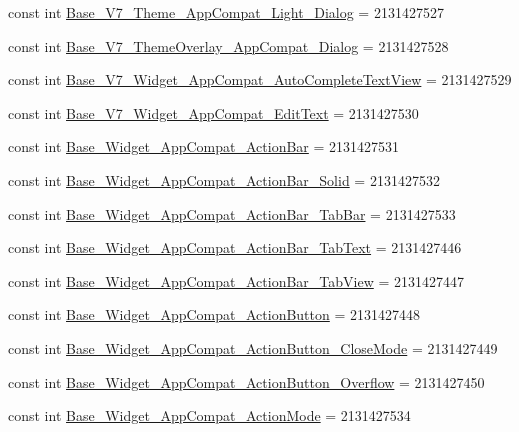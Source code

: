 \begin{CompactItemize}
\item 
const int \hyperlink{class__2doo_1_1_droid_1_1_resource_1_1_style_fa6185cd85da7955cb90ae33723d51fa}{Base\_\-V7\_\-Theme\_\-AppCompat\_\-Light\_\-Dialog} = 2131427527
\item 
const int \hyperlink{class__2doo_1_1_droid_1_1_resource_1_1_style_6022399950c3750d872cf721797a8383}{Base\_\-V7\_\-ThemeOverlay\_\-AppCompat\_\-Dialog} = 2131427528
\item 
const int \hyperlink{class__2doo_1_1_droid_1_1_resource_1_1_style_a0dbbf6b7a5382446156c4c8abe09c50}{Base\_\-V7\_\-Widget\_\-AppCompat\_\-AutoCompleteTextView} = 2131427529
\item 
const int \hyperlink{class__2doo_1_1_droid_1_1_resource_1_1_style_3a19da70cdb33137d14d12c1218bb803}{Base\_\-V7\_\-Widget\_\-AppCompat\_\-EditText} = 2131427530
\item 
const int \hyperlink{class__2doo_1_1_droid_1_1_resource_1_1_style_edea6bcc4eda9d5bb106672365844029}{Base\_\-Widget\_\-AppCompat\_\-ActionBar} = 2131427531
\item 
const int \hyperlink{class__2doo_1_1_droid_1_1_resource_1_1_style_c30bb58a2bffbb18a7fc8c11e44515fe}{Base\_\-Widget\_\-AppCompat\_\-ActionBar\_\-Solid} = 2131427532
\item 
const int \hyperlink{class__2doo_1_1_droid_1_1_resource_1_1_style_02514bb9ba0edac9dd63d411fbfb391b}{Base\_\-Widget\_\-AppCompat\_\-ActionBar\_\-TabBar} = 2131427533
\item 
const int \hyperlink{class__2doo_1_1_droid_1_1_resource_1_1_style_64bcbcacff7de45ff881a9caed1d3627}{Base\_\-Widget\_\-AppCompat\_\-ActionBar\_\-TabText} = 2131427446
\item 
const int \hyperlink{class__2doo_1_1_droid_1_1_resource_1_1_style_67e9f5609d6f1eda419e3f181cc31ee7}{Base\_\-Widget\_\-AppCompat\_\-ActionBar\_\-TabView} = 2131427447
\item 
const int \hyperlink{class__2doo_1_1_droid_1_1_resource_1_1_style_cbdb7fc8aa8fe0a8b2b707162171a8d8}{Base\_\-Widget\_\-AppCompat\_\-ActionButton} = 2131427448
\item 
const int \hyperlink{class__2doo_1_1_droid_1_1_resource_1_1_style_9f07fddd17e98d371bce86ef6f14a6fc}{Base\_\-Widget\_\-AppCompat\_\-ActionButton\_\-CloseMode} = 2131427449
\item 
const int \hyperlink{class__2doo_1_1_droid_1_1_resource_1_1_style_924097c02cbd5477ab4e110169507ab1}{Base\_\-Widget\_\-AppCompat\_\-ActionButton\_\-Overflow} = 2131427450
\item 
const int \hyperlink{class__2doo_1_1_droid_1_1_resource_1_1_style_c35d947499695c0f108d8ee253460910}{Base\_\-Widget\_\-AppCompat\_\-ActionMode} = 2131427534

\end{CompactItemize}
